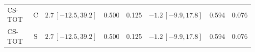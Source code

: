\documentclass[10pt,a4paper]{article}
\begin{document}
\begin{longtable}{lcp{37mm}rrp{37mm}rr}
CS-TOT & C & \(2.7\,[-12.5,39.2]\) & 0.500 & 0.125 & \(-1.2\,[-9.9,17.8]\) & 0.594 & 0.076\\
CS-TOT & S & \(2.7\,[-12.5,39.2]\) & 0.500 & 0.125 & \(-1.2\,[-9.9,17.8]\) & 0.594 & 0.076\\

\end{longtable}
\end{document}
